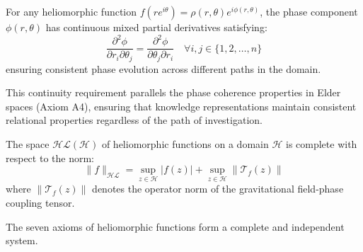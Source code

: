 \begin{axiom}
For any heliomorphic function $f(re^{i\theta}) = \rho(r,\theta)e^{i\phi(r,\theta)}$, the phase component $\phi(r,\theta)$ has continuous mixed partial derivatives satisfying:
\begin{equation}
\frac{\partial^2 \phi}{\partial r_i \partial \theta_j} = \frac{\partial^2 \phi}{\partial \theta_j \partial r_i} \quad \forall i,j \in \{1,2,\ldots,n\}
\end{equation}
ensuring consistent phase evolution across different paths in the domain.
\end{axiom}

\begin{remark}
This continuity requirement parallels the phase coherence properties in Elder spaces (Axiom A4), ensuring that knowledge representations maintain consistent relational properties regardless of the path of investigation.
\end{remark}

\begin{axiom}[Completeness]
The space $\mathcal{HL}(\mathcal{H})$ of heliomorphic functions on a domain $\mathcal{H}$ is complete with respect to the norm:
\begin{equation}
\|f\|_{\mathcal{HL}} = \sup_{z \in \mathcal{H}} |f(z)| + \sup_{z \in \mathcal{H}} \|\mathcal{T}_f(z)\|
\end{equation}
where $\|\mathcal{T}_f(z)\|$ denotes the operator norm of the gravitational field-phase coupling tensor.
\end{axiom}

\begin{theorem}
\label{thm:axiom_completeness}
The seven axioms of heliomorphic functions form a complete and independent system.
\end{theorem}

